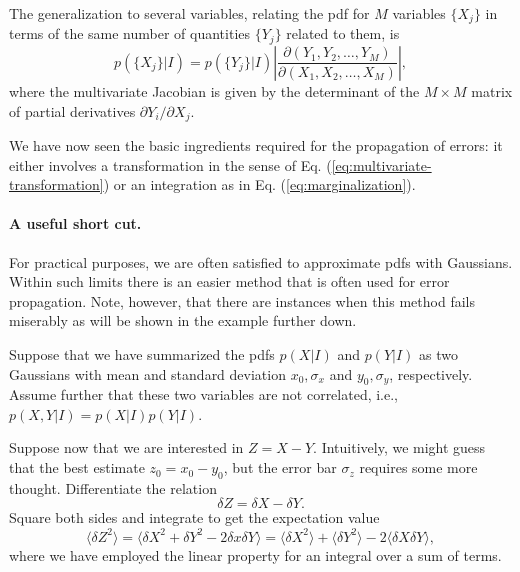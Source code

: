 \documentclass[%
oneside,                 %
final,                   %
10pt]{article}
\newenvironment{summary_mdfboxadmon}[1][]{
\begin{summary_mdfboxmdframed}[frametitle=#1]
}
{
\end{summary_mdfboxmdframed}
}
\begin{document}
The generalization to several variables, relating the pdf for $M$ variables $\{ X_j \}$ in terms of the same number of quantities $\{ Y_j \}$ related to them, is
\begin{equation}
p(\{X_j\}|I) = p(\{Y_j\}|I) \left| \frac{\partial (Y_1, Y_2, \ldots, Y_M)}{\partial (X_1, X_2, \ldots, X_M)} \right|,
\label{eq:multivariate-transformation}
\end{equation}
where the multivariate Jacobian is given by the determinant of the $M \times M$ matrix of partial derivatives $\partial Y_i / \partial X_j$.


\begin{summary_mdfboxadmon}[Summary]
We have now seen the basic ingredients required for the propagation of errors: it either involves a transformation in the sense of Eq. (\ref{eq:multivariate-transformation}) or an integration as in Eq. (\ref{eq:marginalization}).
\end{summary_mdfboxadmon} %



\paragraph{A useful short cut.}
For practical purposes, we are often satisfied to approximate pdfs with Gaussians. Within such limits there is an easier method that is often used for error propagation. Note, however, that there are instances when this method fails miserably as will be shown in the example further down.

Suppose that we have summarized the pdfs $p(X|I)$ and $p(Y|I)$ as two Gaussians with mean and standard deviation $x_0, \sigma_x$ and $y_0, \sigma_y$, respectively. Assume further that these two variables are not correlated, i.e., $p(X,Y|I) = p(X|I) p(Y|I)$.

Suppose now that we are interested in $Z=X-Y$. Intuitively, we might guess that the best estimate $z_0 = x_0 - y_0$, but the error bar $\sigma_z$ requires some more thought. Differentiate the relation
\[
\delta Z = \delta X - \delta Y.
\]
Square both sides and integrate to get the expectation value
\[
\langle \delta Z^2 \rangle = \langle \delta X^2 + \delta Y^2 - 2 \delta x \delta Y \rangle = \langle \delta X^2 \rangle + \langle  \delta Y^2 \rangle - 2 \langle \delta X \delta Y \rangle,
\]
where we have employed the linear property for an integral over a sum of terms.
\end{document}
